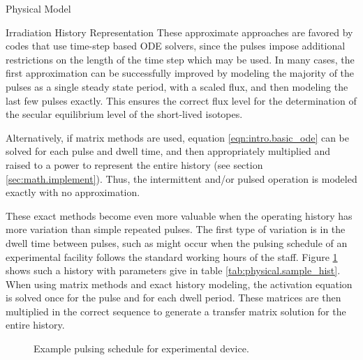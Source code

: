 \begin{chapter}{Physical Model\label{chap:physical}}
\begin{section}{Irradiation History Representation\label{sec:physical.pulsing}}
  These approximate approaches are favored by codes that use time-step
  based ODE solvers, since the pulses impose additional restrictions
  on the length of the time step which may be used.  In many cases,
  the first approximation can be successfully improved by modeling the
  majority of the pulses as a single steady state period, with a
  scaled flux, and then modeling the last few pulses exactly.  This
  ensures the correct flux level for the determination of the secular
  equilibrium level of the short-lived isotopes.
  
  Alternatively, if matrix methods are used, equation
  \ref{eqn:intro.basic_ode} can be solved for each pulse and dwell
  time, and then appropriately multiplied and raised to a power to
  represent the entire history (see section \ref{sec:math.implement}).
  Thus, the intermittent and/or pulsed operation is modeled exactly
  with no approximation\cite{spanglerMS,spangler}.
  
  These exact methods become even more valuable when the operating
  history has more variation than simple repeated pulses.  The first
  type of variation is in the dwell time between pulses, such as might
  occur when the pulsing schedule of an experimental facility follows
  the standard working hours of the staff.  Figure
  \ref{fig:physical.sample_hist} shows such a history with parameters
  give in table \ref{tab:physical.sample_hist}.  When using matrix
  methods and exact history modeling, the activation equation is
  solved once for the pulse and for each dwell period.  These matrices
  are then multiplied in the correct sequence to generate a transfer
  matrix solution for the entire history.

  \begin{figure}[htbp]
    \begin{center}
      \leavevmode
      \caption{Example pulsing schedule for experimental device.}
      \label{fig:physical.sample_hist}
    \end{center}
  \end{figure}


\end{section}
\end{chapter}
